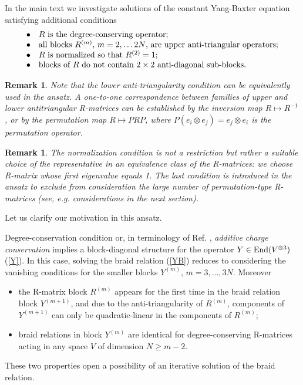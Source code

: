 \documentclass[11pt]{article}
\def\be{\begin{equation}}\def\ee{\end{equation}}
\newcounter{theorem}\def\thetheorem{\thesection.\arabic{theorem}}\makeatletter
\newtheorem{rem}[theorem]{Remark}
\begin{document}
In the main text we investigate solutions of the constant Yang-Baxter equation satisfying additional conditions
\be
\lb{ansatz}
\begin{array}{ll}
\bullet&\mbox{$R$ is the degree-conserving operator;}\\
\bullet&\mbox{all blocks $R^{(m)}$, $m=2,\dots 2N$, are upper anti-triangular operators;}\\
\bullet										&\mbox{$R$ is normalized so that $R^{(2)}=1$;}\\
\bullet&\mbox{blocks of $R$ do not contain $2\times 2$ anti-diagonal sub-blocks.} 
\end{array}
\ee
\begin{rem}{\small\rm
		Note that the lower anti-triangularity condition can be equivalently used in the ansatz. A one-to-one correspondence between families of upper and lower antitriangular R-matrices can be established by the inversion map $R\mapsto R^{-1}$, or by the permutation map $R\mapsto P R P$, where 
		$P(e_i\otimes e_j)=e_j\otimes e_i$ is the permutation operator.}
\end{rem}
\begin{rem}{\small\rm
The normalization condition is not a restriction but rather a suitable choice of the representative in an equivalence class of the R-matrices: we choose R-matrix whose first eigenvalue equals 1.	The last condition is introduced in the ansatz to exclude from consideration the large number of permutation-type R-matrices (see, e.g. considerations in the next section).	}
\end{rem}

Let us clarify our motivation in this ansatz.

Degree-conservation condition or, in terminology of Ref. \cite{HMR}, {\em additive charge conservation}  implies a block-diagonal structure for the operator $Y\in {\rm End}(V^{\otimes 3})$  (\ref{Y}). In this case, solving the braid relation (\ref{YB}) reduces to considering the vanishing conditions for the smaller blocks $Y^{(m)}$, $m=3, \ldots, 3N$. Moreover\vspace{-1mm}
\begin{itemize}
	\item[-\,] 
	the R-matrix block $R^{(m)}$ appears for the first time in the braid relation block
	$Y^{(m+1)}$, and due to the anti-triangularity of $R^{(m)}$,  components of $Y^{(m+1)}$ can only be quadratic-linear in the components of $R^{(m)}$; 
	\item[-\,] 
	braid relations in block $Y^{(m)}$ are identical for degree-conserving R-matrices acting in any space $V$ of dimension $N\geq m-2$. 
\end{itemize} 
\vspace{-1mm}
These two properties open a possibility of an iterative solution of the braid relation.%
\end{document}
